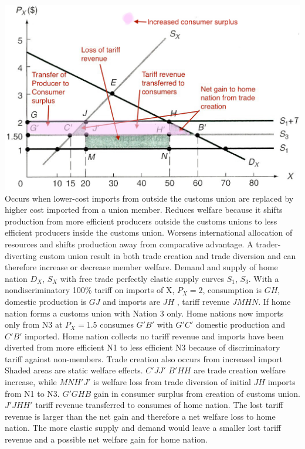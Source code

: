 \documentclass[12pt]{examnotes}
\begin{document}
\includegraphics[scale=0.4]{./imgs/102.jpg}
\ra Occurs when lower-cost imports from outside the customs union are replaced by higher cost imported from a union member. 
\ra Reduces welfare because it shifts production from more efficient producers outside the customs unions to less efficient producers inside the customs union.
\ra Worsens international allocation of resources and shifts production away from comparative advantage.
\ra A trader-diverting custom union result in both trade creation and trade diversion and can therefore increase or decrease member welfare.
\ra Demand and supply of home nation $D_X$, $S_X$ with free trade perfectly elastic supply curves $S_1$, $S_3$.
\ra With a nondiscriminatory 100\% tariff on imports of X, $P_X=2$, consumption is $GH$, domestic production is $GJ$ and imports are $JH$ , tariff revenue $JMHN$. 
\ra If home nation forms a customs union with Nation 3 only. Home nations now imports only from N3 at $P_X=1.5$ consumes $G \prime B \prime$ with $G \prime C \prime$ domestic production and $C \prime B \prime$ imported. Home nation collects no tariff revenue and imports have been diverted from more efficient N1 to less efficient N3 because of discriminatory tariff against non-members. Trade creation also occurs from increased import 
\ra Shaded areas are static welfare effects. $C \prime J J \prime$ $B \prime HH$ are trade creation welfare increase, while $MNH \prime J \prime$ is welfare loss from trade diversion of initial $JH$ imports from N1 to N3. $G \prime GHB$ gain in consumer surplus from creation of customs union. $J \prime JHH \prime$ tariff revenue transferred to consumes of home nation.
\ra The lost tariff revenue is larger than the net gain and therefore a net welfare loss to home nation. The more elastic supply and demand would leave a smaller lost tariff revenue and a possible net welfare gain for home nation.
\end{document}
